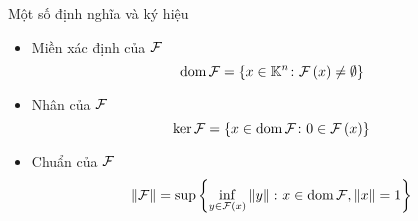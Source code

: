 \begin{frame}{Một số định nghĩa và ký hiệu}
    \begin{itemize}
        \item Miền xác định của \(\mathcal{F}\)
        \begin{equation}
            \operatorname{dom}\mathcal{F}  =\left\{ x\in\mathbb{K}^{n}\colon\mathcal{F}\left(x\right)\ne\emptyset\right\}
        \end{equation}
        \item Nhân của \(\mathcal{F}\)
        \begin{equation}
            \ker\mathcal{F}  =\left\{ x\in\operatorname{dom}\mathcal{F}\colon0\in\mathcal{F}\left(x\right)\right\}
        \end{equation}
        \item Chuẩn của \(\mathcal{F}\)
        \begin{equation}
            \left\lVert\mathcal{F}\right\rVert=\sup\left\{ \inf_{y\in\mathcal{F}\left(x\right)}\left\lVert y\right\rVert\colon x\in\operatorname{dom}\mathcal{F},\left\lVert x\right\rVert=1\right\}
        \end{equation}
    \end{itemize}
\end{frame}


